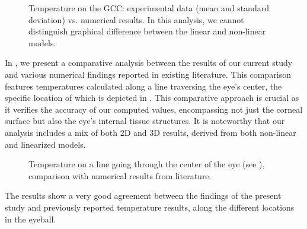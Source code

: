 \begin{figure}
    \centering
    \caption{Temperature on the GCC: experimental data (mean and standard deviation) vs. numerical results. In this analysis, we cannot distinguish graphical difference between the linear and non-linear models.}
    \label{fig:res-gcc}

\end{figure}





In , we present a comparative analysis between the results of our current study and various numerical findings reported in existing literature.
This comparison features temperatures calculated along a line traversing the eye’s center, the specific location of which is depicted in .
This comparative approach is crucial as it verifies the accuracy of our computed values, encompassing not just the corneal surface but also the eye’s internal tissue structures.
It is noteworthy that our analysis includes a mix of both 2D and 3D results, derived from both non-linear and linearized models.


\begin{figure}
    \centering
    
    \caption{Temperature on a line going through the center of the eye (see ), comparison with numerical results from literature.}
    \label{fig:res:line}
\end{figure}

The results show a very good agreement between the findings of the present study and previously reported temperature results,
along the different locations in the eyeball.